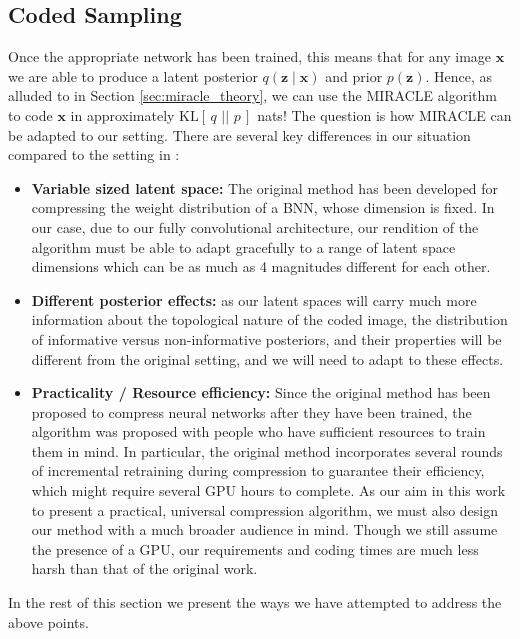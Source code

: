 \documentclass{article}
\renewcommand{\vec}[1]{\mathbf{#1}}
\newcommand{\KL}[2]{\mathrm{KL}[\,#1\,\,||\,\,#2\,]}
\begin{document}
\subsection{Coded Sampling}
\label{sec:coded_sampling}
\par
Once the appropriate network has been trained, this means that for any image $\vec{x}$
we are able to produce a latent posterior $q(\vec{z} \mid \vec{x})$ and prior
$p(\vec{z})$. Hence, as alluded to in Section \ref{sec:miracle_theory}, we can
use the MIRACLE algorithm to code $\vec{x}$ in approximately $\KL{q}{p}$ nats!
The question is how MIRACLE can be adapted to our setting. There are several key
differences in our situation compared to the setting in
\cite{havasi2018minimal}:

\begin{itemize}
\item \textbf{Variable sized latent space:} The original method has been
  developed for compressing the weight distribution of a BNN, whose dimension is
  fixed. In our case, due to our fully convolutional architecture, our rendition
  of the algorithm must be able to adapt gracefully to a range of latent space
  dimensions which can be as much as 4 magnitudes different for each other.

\item \textbf{Different posterior effects:} as our latent spaces will carry much
  more information about the topological nature of the coded image, the
  distribution of informative versus non-informative posteriors, and their
  properties will be different from the original setting, and we will need to
  adapt to these effects.

\item \textbf{Practicality / Resource efficiency:} Since the original method has
  been proposed to compress neural networks after they have been trained, the
  algorithm was proposed with people who have sufficient resources to train them
  in mind. In particular, the original method incorporates several rounds of
  incremental retraining during compression to guarantee their efficiency, which
  might require several GPU hours to complete. As our aim in this work to
  present a practical, universal compression algorithm, we must also design our
  method with a much broader audience in mind. Though we still assume the
  presence of a GPU, our requirements and coding times are much less harsh than
  that of the original work.
\end{itemize}

In the rest of this section we present the ways we have attempted to address the
above points.
\end{document}

